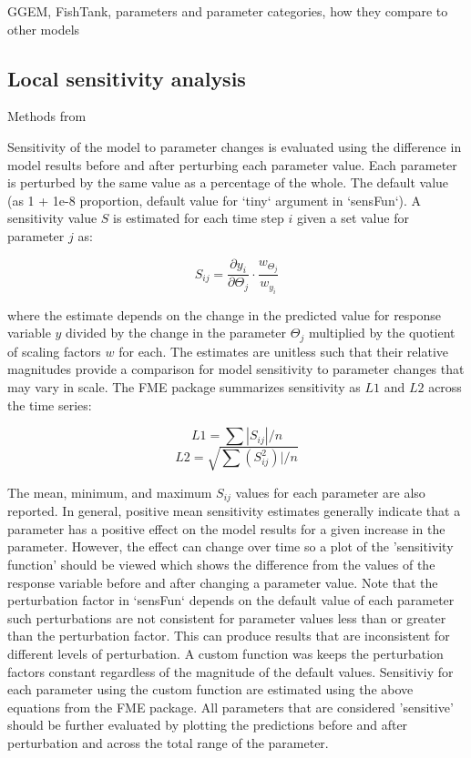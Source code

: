 \documentclass[letterpaper,12pt,oneside]{article}\usepackage[]{graphicx}\usepackage[]{color}
\begin{document}
GGEM, FishTank, parameters and parameter categories, how they compare to other models

\subsection{Local sensitivity analysis}

Methods from \cite{Soetaert10}

Sensitivity of the model to parameter changes is evaluated using the difference in model results before and after perturbing each parameter value.  Each parameter is perturbed by the same value as a percentage of the whole.  The default value (as 1 + 1e-8 proportion, default value for `tiny` argument in `sensFun`).  A sensitivity value $S$ is estimated for each time step $i$ given a set value for parameter $j$ as:

\begin{equation}
S_{ij} = \frac{\partial y_i}{\partial \Theta_j}\cdot\frac{w_{\Theta_j}}{w_{y_i}}
\end{equation}

where the estimate depends on the change in the predicted value for response variable $y$ divided by the change in the parameter $\Theta_j$ multiplied by the quotient of scaling factors $w$ for each.  The estimates are unitless such that their relative magnitudes provide a comparison for model sensitivity to parameter changes that may vary in scale.  The FME package summarizes sensitivity as $L1$ and $L2$ across the time series:

\begin{equation}
L1 = \sum|S_{ij}|/n
\end{equation}
\begin{equation}
L2 = \sqrt{\sum\left(S_{ij}^2\right)|/n}
\end{equation}

The mean, minimum, and maximum $S_{ij}$ values for each parameter are also reported.  In general, positive mean sensitivity estimates generally indicate that a parameter has a positive effect on the model results for a given increase in the parameter.  However, the effect can change over time so a plot of the 'sensitivity function' should be viewed which shows the difference from the values of the response variable before and after changing a parameter value.  Note that the perturbation factor in `sensFun` depends on the default value of each parameter such perturbations are not consistent for parameter values less than or greater than the perturbation factor.  This can produce results that are inconsistent for different levels of perturbation.  A custom function was keeps the perturbation factors constant regardless of the magnitude of the default values.  Sensitiviy for each parameter using the custom function are estimated using the above equations from the FME package. All parameters that are considered 'sensitive' should be further evaluated by plotting the predictions before and after perturbation and across the total range of the parameter. 
\end{document}

